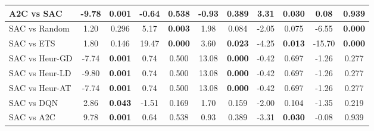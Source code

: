 \begin{tabular}{lcccccccccc}
	A2C vs SAC       & -9.78          & \textbf{0.001}         & -0.64          & 0.538                  & -0.93          & 0.389                  & 3.31           & \textbf{0.030}         & 0.08           & 0.939                  \\
	\midrule 
	SAC vs Random    & 1.20           & 0.296                  & 5.17           & \textbf{0.003}         & 1.98           & 0.084                  & -2.05          & 0.075                  & -6.55          & \textbf{0.000}         \\
	SAC vs ETS       & 1.80           & 0.146                  & 19.47          & \textbf{0.000}         & 3.60           & \textbf{0.023}         & -4.25          & \textbf{0.013}         & -15.70         & \textbf{0.000}         \\
	SAC vs Heur-GD   & -7.74          & \textbf{0.001}         & 0.74           & 0.500                  & 13.08          & \textbf{0.000}         & -0.42          & 0.697                  & -1.26          & 0.277                  \\
	SAC vs Heur-LD   & -9.80          & \textbf{0.001}         & 0.74           & 0.500                  & 13.08          & \textbf{0.000}         & -0.42          & 0.697                  & -1.26          & 0.277                  \\
	SAC vs Heur-AT   & -7.74          & \textbf{0.001}         & 0.74           & 0.500                  & 13.08          & \textbf{0.000}         & -0.42          & 0.697                  & -1.26          & 0.277                  \\
	SAC vs DQN       & 2.86           & \textbf{0.043}         & -1.51          & 0.169                  & 1.70           & 0.159                  & -2.00          & 0.104                  & -1.35          & 0.219                  \\
	SAC vs A2C       & 9.78           & \textbf{0.001}         & 0.64           & 0.538                  & 0.93           & 0.389                  & -3.31          & \textbf{0.030}         & -0.08          & 0.939         \\
	\bottomrule         
\end{tabular}